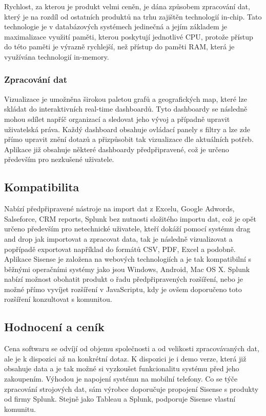 \documentclass[czech,BP]{thesiskiv}
\begin{document}
  
  Rychlost, za kterou je produkt velmi ceněn, je dána způsobem zpracování dat, který je na rozdíl od ostatních produktů na trhu zajištěn technologií in-chip. Tato technologie je v databázových systémech jedinečná a jejím základem je maximalizace využití paměti, kterou poskytují jednotlivé CPU, protože přístup do této paměti je výrazně rychlejší, než přístup do paměti RAM, která je využívána technologií in-memory.
 \subsubsection{Zpracování dat}
 Vizualizace je umožněna širokou paletou grafů a geografických map, které lze skládat do interaktivních real-time dashboardů. Tyto dashboardy se následně mohou sdílet napříč organizací a sledovat jeho vývoj a případně upravit uživatelská práva. Každý dashboard obsahuje ovládací panely s filtry a lze zde přímo upravit znění dotazů a přizpůsobit tak vizualizace dle aktuálních potřeb. Aplikace již obsahuje některé dashboardy předpřipravené, což je určeno především pro nezkušené uživatele.\cite{SisenseVizualize}
 		
 
 \subsection{Kompatibilita}
  Nabízí předpřipravené nástroje na import dat z Excelu, Google Adwords, Salseforce, CRM reports, Splunk bez nutnosti složitého importu dat, což je opět určeno především pro netechnické uživatele, kteří dokáží pomocí systému drag and drop jak importovat a zpracovat data, tak je následně vizualizovat a popřípadě exportovat například do formátů CSV, PDF, Excel a podobně. \cite{PDF} Aplikace Sisense je založena na webových technologiích a je tak kompatibilní s běžnými operačními systémy jako jsou Windows, Android, Mac OS X. Splunk nabízí možnost obohatit produkt o řadu předpřipravených rozšíření, nebo je možné  přímo vyvíjet rozšíření v JavaScriptu, kdy je ovšem doporučeno toto rozšíření konzultovat s komunitou.\cite{SisenseAdd-ons}
 
 \subsection{Hodnocení a ceník}
 Cena softwaru se odvíjí od objemu společnosti a od velikosti zpracovávaných dat, ale je k dispozici až na konkrétní dotaz. K dispozici je i demo verze, která již obsahuje data a je tak možné si vyzkoušet funkcionalitu systému před jeho zakoupením. Výhodou je napojení systému na mobilní telefony. Co se týče zpracování strojových dat, sám výrobce doporučuje propojení Sisense s produkty od firmy Splunk. Stejně jako Tableau a Splunk, podporuje Sisense vlastní komunitu.\cite{SisenseAndSplunk}
 
\end{document}
